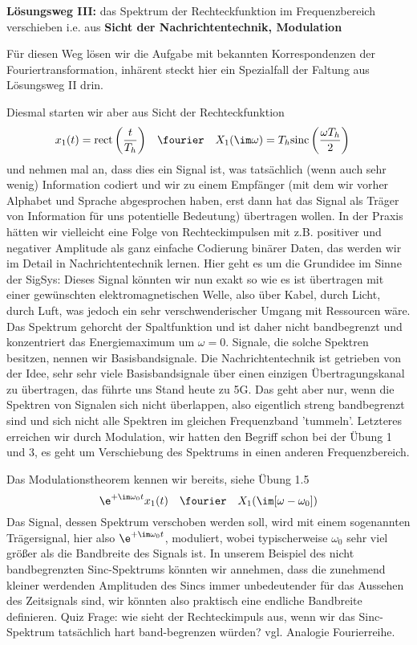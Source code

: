 \begin{ExCalc}
\textbf{Lösungsweg III:}
das Spektrum der Rechteckfunktion im Frequenzbereich verschieben
i.e. aus \textbf{Sicht der Nachrichtentechnik, Modulation}

Für diesen Weg lösen wir die Aufgabe mit bekannten Korrespondenzen der
Fouriertransformation, inhärent steckt hier ein Spezialfall der Faltung aus
Lösungsweg II drin.

Diesmal starten wir aber aus Sicht der Rechteckfunktion
\begin{align}
x_1(t) = \mathrm{rect}\left(\frac{t}{T_h}\right) &\quad \fourier \quad X_1(\im\omega) = T_h \mathrm{sinc}\left(\frac{\omega T_h}{2}\right)
\end{align}
und nehmen mal an, dass dies ein Signal ist, was tatsächlich (wenn auch sehr wenig)
Information codiert und wir zu einem Empfänger (mit dem wir vorher
Alphabet und Sprache abgesprochen haben,
erst dann hat das Signal als Träger von Information
für uns potentielle Bedeutung) übertragen wollen.
In der Praxis hätten wir vielleicht eine Folge von Rechteckimpulsen
mit z.B. positiver und negativer Amplitude als ganz einfache Codierung binärer
Daten, das werden wir im Detail in Nachrichtentechnik lernen. Hier geht es um die
Grundidee im Sinne der SigSys: Dieses Signal könnten wir nun exakt so wie es ist
übertragen mit einer gewünschten elektromagnetischen Welle, also über Kabel, durch Licht,
durch Luft, was jedoch ein sehr verschwenderischer Umgang mit Ressourcen wäre.
Das Spektrum gehorcht der Spaltfunktion und ist daher nicht bandbegrenzt und
konzentriert das Energiemaximum um $\omega=0$. Signale,
die solche Spektren besitzen, nennen wir Basisbandsignale.
Die Nachrichtentechnik ist getrieben von der Idee, sehr sehr viele Basisbandsignale
über einen einzigen Übertragungskanal zu übertragen, das führte uns Stand heute
zu 5G. Das geht aber nur, wenn die Spektren von Signalen sich nicht überlappen, also
eigentlich streng bandbegrenzt sind
und sich nicht alle Spektren im gleichen Frequenzband 'tummeln'.
Letzteres erreichen wir durch Modulation, wir hatten den Begriff schon bei der Übung 1 und 3,
es geht um Verschiebung des Spektrums in einen anderen Frequenzbereich.

Das Modulationstheorem kennen wir bereits, siehe Übung 1.5
\begin{equation}
  \e^{+\im\omega_0 t} x_1(t) \quad\fourier\quad X_1(\im[\omega-\omega_0])
\end{equation}
Das Signal, dessen Spektrum verschoben werden soll, wird mit einem sogenannten Trägersignal,
hier also $\e^{+\im\omega_0 t}$, moduliert, wobei typischerweise $\omega_0$ sehr viel größer als
die Bandbreite des Signals ist. In unserem Beispiel des nicht bandbegrenzten Sinc-Spektrums
könnten wir annehmen, dass die zunehmend kleiner werdenden Amplituden des Sincs
immer unbedeutender für das Aussehen des Zeitsignals sind, wir könnten also praktisch eine
endliche Bandbreite definieren. Quiz Frage: wie sieht der Rechteckimpuls aus, wenn
wir das Sinc-Spektrum tatsächlich hart band-begrenzen würden? vgl. Analogie Fourierreihe.


\end{ExCalc}
